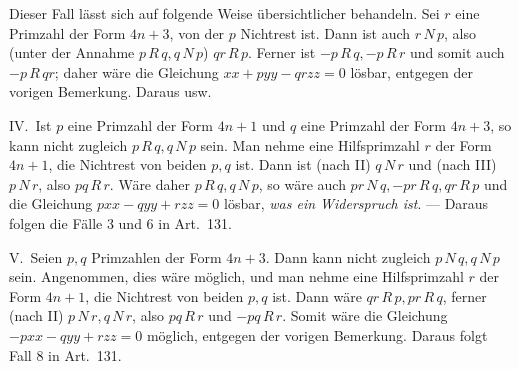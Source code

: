 Dieser Fall lässt sich auf folgende Weise übersichtlicher
behandeln. Sei \(r\) eine Primzahl der Form \(4n+3\),
von der \(p\) Nichtrest ist. Dann ist auch \(r\,N\,p\),
also (unter der Annahme \(p\,R\,q,q\,N\,p\)) \(qr\,R\,p\). Ferner ist
\(-p\,R\,q,-p\,R\,r\) und somit auch \(-p\,R\,qr\); daher wäre die Gleichung
\(xx+pyy-qrzz=0\) lösbar, entgegen der vorigen Bemerkung. Daraus
usw.

IV.\ Ist \(p\) eine Primzahl der Form \(4n+1\) und
\(q\) eine Primzahl der Form \(4n+3\),
so kann nicht zugleich \(p\,R\,q,q\,N\,p\) sein. Man nehme eine
Hilfsprimzahl \(r\) der Form \(4n+1\), die Nichtrest
von beiden \(p,q\) ist. Dann ist (nach II) \(q\,N\,r\)
und (nach III) \(p\,N\,r\), also \(pq\,R\,r\). Wäre daher
\(p\,R\,q,q\,N\,p\), so wäre auch \(pr\,N\,q,-pr\,R\,q,qr\,R\,p\) und die Gleichung
\(pxx-qyy+rzz=0\) lösbar, \emph{was ein Widerspruch ist}. --- Daraus
folgen die Fälle 3 und 6 in Art.\ 131.

V.\ Seien \(p,q\) Primzahlen der Form \(4n+3\). Dann
kann nicht zugleich \(p\,N\,q,q\,N\,p\) sein. Angenommen, dies wäre
möglich, und man nehme eine Hilfsprimzahl \(r\) der
Form \(4n+1\), die Nichtrest von beiden \(p,q\) ist.
Dann wäre \(qr\,R\,p,pr\,R\,q\), ferner (nach II) \(p\,N\,r,q\,N\,r\), also
\(pq\,R\,r\) und \(-pq\,R\,r\). Somit wäre die Gleichung \(-pxx-qyy+rzz=0\)
möglich, entgegen der vorigen Bemerkung. Daraus folgt
Fall 8 in Art.\ 131.
